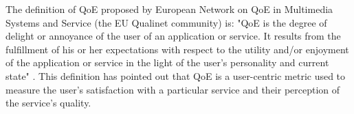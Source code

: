 The definition of QoE proposed by European Network on QoE in Multimedia Systems and Service (the EU Qualinet community) is:
"QoE is the degree of delight or annoyance of the user of an application or service.
It results from the fulfillment of his or her expectations with respect to the utility and/or enjoyment of the application or service in the light of the user's personality and current state" \cite{QoEDef_Qualinet, QoEDef_ITU}.
This definition has pointed out that QoE is a user-centric metric used to measure the user's satisfaction with a particular service and their perception of the service's quality.